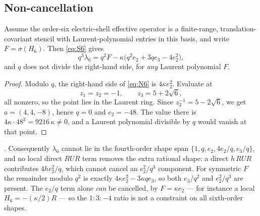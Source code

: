 
\subsection{Non-cancellation}

\begin{theorem}
\label{thm:noncancellation}
Assume the order-six electric-shell effective operator is a
finite-range, translation-covariant stencil with Laurent-polynomial
entries in this basis, and write $F = \sigma(H_6)$. Then \eqref{eq:S6}
gives
\begin{equation}
  q^3 \lambda_6 = q^2 F - \kappa\big(q^2 e_2 + 3q e_3 - 4e_2^2\big),
  \label{eq:N6}
\end{equation}
and $q$ does not divide the right-hand side, for \emph{any} Laurent
polynomial $F$.
\end{theorem}

\begin{proof}
Modulo $q$, the right-hand side of \eqref{eq:N6} is $4\kappa e_2^2$.
Evaluate at
\begin{equation}
  z_1 = z_2 = -1, \qquad z_3 = 5 + 2\sqrt{6},
\end{equation}
all nonzero, so the point lies in the Laurent ring. Since
$z_3^{-1} = 5 - 2\sqrt6$, we get $a = (4, 4, -8)$, hence $q = 0$ and
$e_2 = -48$. The value there is $4\kappa \cdot 48^2 = 9216\,\kappa \neq 0$,
and a Laurent polynomial divisible by $q$ would vanish at that point.
\end{proof}

\noindent\Tone{}. Consequently $\lambda_6$ cannot lie in the
fourth-order shape span $\{1, q, e_2, 4e_2/q, e_3/q\}$, and no local
direct $RUR$ term removes the extra rational shape: a direct $h\,RUR$
contributes $4h e_2^2/q$, which cannot cancel an $e_2^2/q^3$ component.
For symmetric $F$ the remainder modulo $q^2$ is exactly
$4\kappa e_2^2 - 3\kappa q e_3$, so both $e_3/q^2$ and $e_2^2/q^3$ are
present. The $e_2/q$ term alone \emph{can} be cancelled, by
$F = \kappa e_2$ --- for instance a local $H_6 = -(\kappa/2)R$ --- so
the $1:3:-4$ ratio is not a constraint on all sixth-order shapes.

